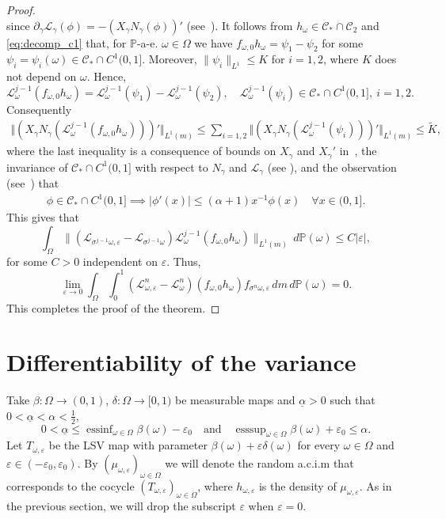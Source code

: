 \documentclass[12pt,reqno,a4paper]{article}
\newcommand\cL{{\mathcal L}}
\newcommand\cC{{\mathcal C}}
\DeclareMathOperator{\esssup}{esssup}
\DeclareMathOperator{\essinf}{essinf}
\begin{document}
\begin{proof}
\[		\]
		since $\partial_\gamma \mathcal L_\gamma(\phi)=-(X_\gamma N_\gamma (\phi))'$ (see~\cite[p.865]{BT}). It follows from $h_\omega \in \mathcal C_*\cap \mathcal C_2$ and
		 \eqref{eq:decomp_c1} that, for $\mathbb P$-a-e. $\omega \in \Omega$ we have $f_{\omega, 0}h_\omega=\psi_1-\psi_2$ for some $\psi_i=\psi_i(\omega)\in \mathcal C_*\cap C^1(0,1]$.  Moreover, $\|\psi_i\|_{L^1}\le K$ for $i=1, 2$, where $K$ does not depend on $\omega$.
		Hence, 
		\[
		\mathcal L_\omega^{j-1}(f_{\omega, 0}h_\omega)=\mathcal L_\omega^{j-1}(\psi_1)-\mathcal L_\omega^{j-1}(\psi_2), \quad \mathcal L_\omega^{j-1}(\psi_i)\in \mathcal C_*\cap C^1(0,1], \ i=1, 2.
		\]
		Consequently
		\begin{align*}
			\Vert 
			(X_\gamma N_\gamma (\mathcal L_\omega^{j-1}(f_{\omega, 0}h_\omega)))'
			\Vert_{L^1(m)}
			\le \sum_{i=1,2} \Vert 
			(X_\gamma N_\gamma (\mathcal L_\omega^{j-1}( \psi_i )))'
			\Vert_{L^1(m)} \le \tilde{K},
		\end{align*}
		where the last inequality is a consequence of bounds on $X_\gamma$ and $X_\gamma'$ in~\cite[(2.3) and (2.4)]{BT}, the invariance of $\cC_* \cap C^1(0,1]$ with respect to $N_\gamma$
		and $\cL_\gamma$ (see \cite[Proposition 5]{DGTS}), and the 
		observation (see~\cite[Remark 1]{DGTS}) that
		\begin{align}\label{eq:cone_fun_diff}
			\phi \in \cC_* \cap C^1(0,1] \implies 
			|\phi'(x)| \le (\alpha + 1) x^{-1} \phi(x) \quad 
			\forall x \in (0,1].
		\end{align}
		This gives that 
		\[
		\int_\Omega \|(\mathcal L_{\sigma^{j-1}\omega, \varepsilon}-\mathcal L_{\sigma^{j-1}\omega}) \mathcal L_\omega^{j-1}(f_{\omega, 0}h_\omega)\|_{L^1(m)}\, d\mathbb P(\omega) \le C|\varepsilon|,
		\]
		for some $C>0$ independent on $\varepsilon$. Thus, 
		\[
		\lim_{\varepsilon \to 0}\int_\Omega \int_0^1 (\mathcal L_{\omega, \varepsilon}^n-\mathcal L_\omega^n)(f_{\omega, 0}h_\omega) f_{\sigma^n \omega, \varepsilon}\, dm\, d\mathbb P(\omega)=0.
		\]
		This completes the proof of the theorem.
	\end{proof}
	
	\section{Differentiability of the variance}
	
	
	Take $\beta \colon \Omega\to (0, 1)$, $\delta \colon \Omega \to [0, 1)$ be measurable maps and $\underline{\alpha}>0$ such that $0<\underline{\alpha}<\alpha<\frac 1 2$,
	\[
	0<\underline{\alpha}\le \essinf_{\omega \in \Omega}\beta(\omega)-\varepsilon_0 \quad \text{and} \quad \esssup_{\omega \in \Omega}\beta(\omega)+\varepsilon_0\le \alpha.
	\]
	Let $T_{\omega, \varepsilon}$ be the LSV map with parameter $\beta(\omega)+\varepsilon \delta (\omega)$ for every $\omega \in \Omega$ and $\varepsilon \in (-\varepsilon_0, \varepsilon_0)$. By $(\mu_{\omega, \varepsilon})_{\omega \in \Omega}$ we will denote the random a.c.i.m that corresponds to the cocycle $(T_{\omega, \varepsilon})_{\omega \in \Omega}$, where $h_{\omega, \varepsilon}$ is the density of $\mu_{\omega, \varepsilon}$. As in the previous section,  we will drop the subscript $\varepsilon$ when $\varepsilon=0$. 
	
\end{document}
